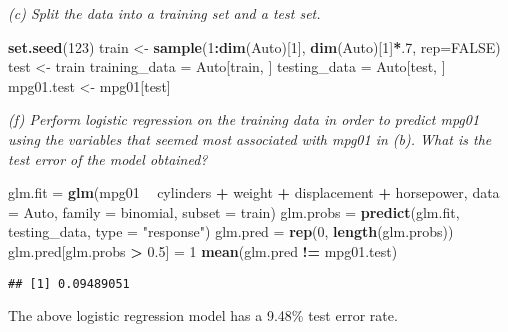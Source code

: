 \documentclass[]{article}
\newenvironment{Shaded}{\begin{snugshade}}{\end{snugshade}}
\newcommand{\KeywordTok}[1]{\textcolor[rgb]{0.13,0.29,0.53}{\textbf{#1}}}
\newcommand{\DataTypeTok}[1]{\textcolor[rgb]{0.13,0.29,0.53}{#1}}
\newcommand{\DecValTok}[1]{\textcolor[rgb]{0.00,0.00,0.81}{#1}}
\newcommand{\FloatTok}[1]{\textcolor[rgb]{0.00,0.00,0.81}{#1}}
\newcommand{\StringTok}[1]{\textcolor[rgb]{0.31,0.60,0.02}{#1}}
\newcommand{\OtherTok}[1]{\textcolor[rgb]{0.56,0.35,0.01}{#1}}
\newcommand{\OperatorTok}[1]{\textcolor[rgb]{0.81,0.36,0.00}{\textbf{#1}}}
\newcommand{\NormalTok}[1]{#1}
\begin{document}
\emph{(c) Split the data into a training set and a test set.}

\begin{Shaded}
\begin{Highlighting}[]
\KeywordTok{set.seed}\NormalTok{(}\DecValTok{123}\NormalTok{)}
\NormalTok{train <-}\StringTok{ }\KeywordTok{sample}\NormalTok{(}\DecValTok{1}\OperatorTok{:}\KeywordTok{dim}\NormalTok{(Auto)[}\DecValTok{1}\NormalTok{], }\KeywordTok{dim}\NormalTok{(Auto)[}\DecValTok{1}\NormalTok{]}\OperatorTok{*}\NormalTok{.}\DecValTok{7}\NormalTok{, }\DataTypeTok{rep=}\OtherTok{FALSE}\NormalTok{)}
\NormalTok{test <-}\StringTok{ }\NormalTok{train}
\NormalTok{training_data =}\StringTok{ }\NormalTok{Auto[train, ]}
\NormalTok{testing_data =}\StringTok{ }\NormalTok{Auto[test, ]}
\NormalTok{mpg01.test <-}\StringTok{ }\NormalTok{mpg01[test]}
\end{Highlighting}
\end{Shaded}

\emph{(f) Perform logistic regression on the training data in order to
predict mpg01 using the variables that seemed most associated with mpg01
in (b). What is the test error of the model obtained?}

\begin{Shaded}
\begin{Highlighting}[]
\NormalTok{glm.fit =}\StringTok{ }\KeywordTok{glm}\NormalTok{(mpg01 }\OperatorTok{~}\StringTok{ }\NormalTok{cylinders }\OperatorTok{+}\StringTok{ }\NormalTok{weight }\OperatorTok{+}\StringTok{ }\NormalTok{displacement }\OperatorTok{+}\StringTok{ }\NormalTok{horsepower, }\DataTypeTok{data =}\NormalTok{ Auto, }
    \DataTypeTok{family =}\NormalTok{ binomial, }\DataTypeTok{subset =}\NormalTok{ train)}
\NormalTok{glm.probs =}\StringTok{ }\KeywordTok{predict}\NormalTok{(glm.fit, testing_data, }\DataTypeTok{type =} \StringTok{"response"}\NormalTok{)}
\NormalTok{glm.pred =}\StringTok{ }\KeywordTok{rep}\NormalTok{(}\DecValTok{0}\NormalTok{, }\KeywordTok{length}\NormalTok{(glm.probs))}
\NormalTok{glm.pred[glm.probs }\OperatorTok{>}\StringTok{ }\FloatTok{0.5}\NormalTok{] =}\StringTok{ }\DecValTok{1}
\KeywordTok{mean}\NormalTok{(glm.pred }\OperatorTok{!=}\StringTok{ }\NormalTok{mpg01.test)}
\end{Highlighting}
\end{Shaded}

\begin{verbatim}
## [1] 0.09489051
\end{verbatim}

The above logistic regression model has a 9.48\% test error rate.
\end{document}
